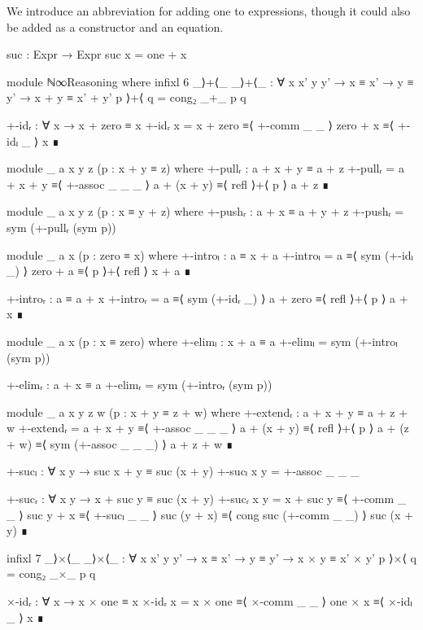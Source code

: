 We introduce an abbreviation for adding one to expressions, though it could also
be added as a constructor and an equation.
\begin{code}
  suc : Expr → Expr
  suc x = one + x
\end{code}
\begin{code}[hide]
  module ℕ∞Reasoning where
    infixl 6 _⟩+⟨_
    _⟩+⟨_ : ∀ {x x' y y'} → x ≡ x' → y ≡ y' → x + y ≡ x' + y'
    p ⟩+⟨ q = cong₂ _+_ p q

    +-idᵣ : ∀ x → x + zero ≡ x
    +-idᵣ x =
      x + zero ≡⟨ +-comm _ _ ⟩
      zero + x ≡⟨ +-idₗ _ ⟩
      x        ∎

    module _ {a x y z} (p : x + y ≡ z) where
      +-pullᵣ : a + x + y ≡ a + z
      +-pullᵣ =
        a + x + y   ≡⟨ +-assoc _ _ _ ⟩
        a + (x + y) ≡⟨ refl ⟩+⟨ p ⟩
        a + z       ∎

    module _ {a x y z} (p : x ≡ y + z) where
      +-pushᵣ : a + x ≡ a + y + z
      +-pushᵣ = sym (+-pullᵣ (sym p))

    module _ {a x} (p : zero ≡ x) where
      +-introₗ : a ≡ x + a
      +-introₗ =
        a        ≡⟨ sym (+-idₗ _) ⟩
        zero + a ≡⟨ p ⟩+⟨ refl ⟩
        x + a    ∎

      +-introᵣ : a ≡ a + x
      +-introᵣ =
        a        ≡⟨ sym (+-idᵣ _) ⟩
        a + zero ≡⟨ refl ⟩+⟨ p ⟩
        a + x    ∎

    module _ {a x} (p : x ≡ zero) where
      +-elimₗ : x + a ≡ a
      +-elimₗ = sym (+-introₗ (sym p))

      +-elimᵣ : a + x ≡ a
      +-elimᵣ = sym (+-introᵣ (sym p))

    module _ {a x y z w} (p : x + y ≡ z + w) where
      +-extendᵣ : a + x + y ≡ a + z + w
      +-extendᵣ =
        a + x + y   ≡⟨ +-assoc _ _ _ ⟩
        a + (x + y) ≡⟨ refl ⟩+⟨ p ⟩
        a + (z + w) ≡⟨ sym (+-assoc _ _ _) ⟩
        a + z + w   ∎

    +-sucₗ : ∀ x y → suc x + y ≡ suc (x + y)
    +-sucₗ x y = +-assoc _ _ _

    +-sucᵣ : ∀ x y → x + suc y ≡ suc (x + y)
    +-sucᵣ x y =
      x + suc y   ≡⟨ +-comm _ _ ⟩
      suc y + x   ≡⟨ +-sucₗ _ _ ⟩
      suc (y + x) ≡⟨ cong suc (+-comm _ _) ⟩
      suc (x + y) ∎

    infixl 7 _⟩×⟨_
    _⟩×⟨_ : ∀ {x x' y y'} → x ≡ x' → y ≡ y' → x × y ≡ x' × y'
    p ⟩×⟨ q = cong₂ _×_ p q

    ×-idᵣ : ∀ x → x × one ≡ x
    ×-idᵣ x =
      x × one ≡⟨ ×-comm _ _ ⟩
      one × x ≡⟨ ×-idₗ _ ⟩
      x       ∎


\end{code}
